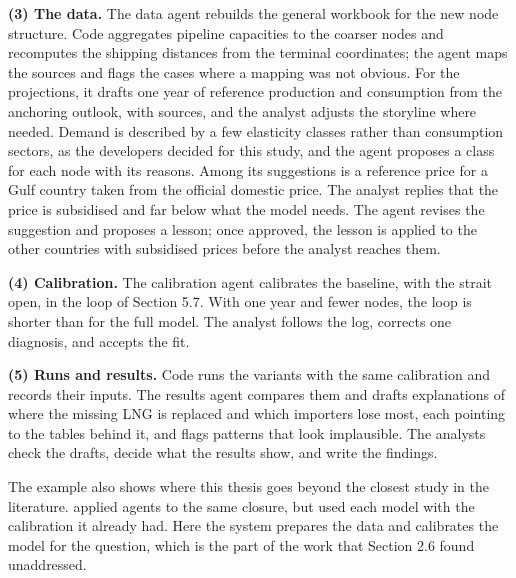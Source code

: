 \textbf{(3) The data.} The data agent rebuilds the general workbook for the new node structure.
Code aggregates pipeline capacities to the coarser nodes and recomputes the shipping distances from the terminal coordinates; the agent maps the sources and flags the cases where a mapping was not obvious.
For the projections, it drafts one year of reference production and consumption from the anchoring outlook, with sources, and the analyst adjusts the storyline where needed.
Demand is described by a few elasticity classes rather than consumption sectors, as the developers decided for this study, and the agent proposes a class for each node with its reasons.
Among its suggestions is a reference price for a Gulf country taken from the official domestic price.
The analyst replies that the price is subsidised and far below what the model needs.
The agent revises the suggestion and proposes a lesson; once approved, the lesson is applied to the other countries with subsidised prices before the analyst reaches them.

\textbf{(4) Calibration.} The calibration agent calibrates the baseline, with the strait open, in the loop of Section 5.7.
With one year and fewer nodes, the loop is shorter than for the full model.
The analyst follows the log, corrects one diagnosis, and accepts the fit.

\textbf{(5) Runs and results.} Code runs the variants with the same calibration and records their inputs.
The results agent compares them and drafts explanations of where the missing LNG is replaced and which importers lose most, each pointing to the tables behind it, and flags patterns that look implausible.
The analysts check the drafts, decide what the results show, and write the findings.

The example also shows where this thesis goes beyond the closest study in the literature.
\citet{golden2026agentic} applied agents to the same closure, but used each model with the calibration it already had.
Here the system prepares the data and calibrates the model for the question, which is the part of the work that Section 2.6 found unaddressed.
